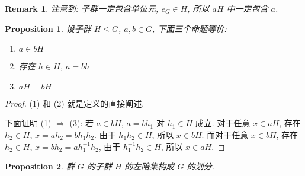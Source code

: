 \documentclass[UTF8]{ctexart}
\theoremstyle{mystyle}
\newtheorem{proposition}{Proposition}[section]
\theoremstyle{myremark}
\newtheorem*{remark}{Remark}
\theoremstyle{plain}
\begin{document}
\begin{remark}
    注意到: 子群一定包含单位元, $ e_G \in H $, 所以 $ aH $ 中一定包含 $ a $.
\end{remark}

\begin{proposition}
    设子群 $ H \le G $, $ a, b \in G $, 下面三个命题等价:
    \begin{enumerate}
        \item $ a \in bH $
        \item 存在 $ h \in H $, $ a = bh $
        \item $ aH = bH $
    \end{enumerate}
\end{proposition}

\begin{proof}
    (1) 和 (2) 就是定义的直接阐述.

    下面证明 (1) $ \Longrightarrow $ (3): 若 $ a \in bH $, $ a = bh_1 $ 对 $ h_1 \in H $ 成立. 对于任意 $ x \in aH $, 存在 $ h_2 \in H $, $ x = ah_2 = b h_1 h_2 $. 由于 $ h_1 h_2 \in H $, 所以 $ x \in b H $. 而对于任意 $ x \in bH $, 存在 $ h_2 \in H $, $ x = b h_2 = a h_1^{-1} h_2 $, 由于 $ h_1^{-1} h_2 \in H $, 所以 $ x \in a H $.
\end{proof}

\begin{proposition}
    群 $ G $ 的子群 $ H $ 的左陪集构成 $ G $ 的划分.
\end{proposition}
\end{document}
